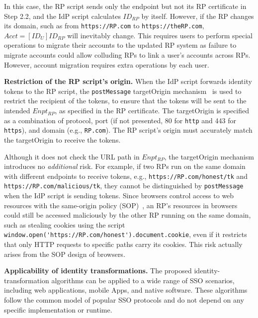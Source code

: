 In this case, the RP script sends only the endpoint but not its RP certificate in Step 2.2, and the IdP script calculates $ID_{RP}$ by itself. %
However, if the RP changes its domain, such as from \verb+https://RP.com+ to \verb+https://theRP.com+,
$Acct = [ID_U]ID_{RP}$ will inevitably change.
This requires users to perform special operations to migrate their accounts to the updated RP system
 as failure to migrate accounts could allow colluding RPs to link a user's accounts across RPs.
 However, account migration requires extra operations by each user.

\noindent \textbf{Restriction of the RP script's origin.}
When the IdP script forwards identity tokens to the RP script,
 the \verb+postMessage+ targetOrigin mechanism~\cite{postm-targeto} is used to restrict the recipient of the tokens,
  to ensure that the tokens will be sent to the intended $Enpt_{RP}$, as specified in the RP certificate.
  The targetOrigin is specified as a combination of protocol, port (if not presented, 80 for \verb+http+ and 443 for \verb+https+), and domain (e.g., \verb+RP.com+).
The RP script's origin must accurately match the targetOrigin to receive the tokens.

Although it does not check the URL path in $Enpt_{RP}$,
the targetOrigin mechanism introduces no {\em additional} risk.
For example, if two RPs run on the same domain with different endpoints to receive tokens,
 e.g., \verb+https://RP.com/honest/tk+ and \verb+https://RP.com/malicious/tk+,
  they cannot be distinguished by \verb+postMessage+ when the IdP script is sending tokens.
Since browsers control access to web resources with the same-origin policy (SOP)~\cite{sop},
   an RP's resources in browsers could still be accessed maliciously by the other RP running on the same domain,
    such as stealing cookies using the script \verb+window.open('https://RP.com/honest').document.cookie+,
even if it restricts that only HTTP requests to specific paths carry its cookies.
 This risk actually arises from the SOP design of browsers. %



\noindent \textbf{Applicability of identity transformations.}
The proposed identity-transformation algorithms %
can be applied to a wide range of SSO scenarios, including web applications, mobile Apps, and native software.
These algorithms follow the common model of popular SSO protocols and do not depend on any specific implementation or runtime.%



